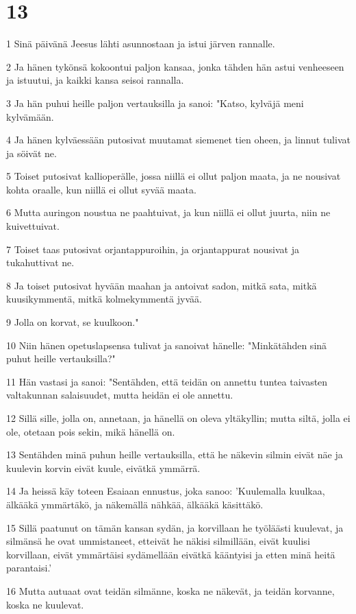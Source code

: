 \chapter{13}

\par 1 Sinä päivänä Jeesus lähti asunnostaan ja istui järven rannalle.
\par 2 Ja hänen tykönsä kokoontui paljon kansaa, jonka tähden hän astui venheeseen ja istuutui, ja kaikki kansa seisoi rannalla.
\par 3 Ja hän puhui heille paljon vertauksilla ja sanoi: "Katso, kylväjä meni kylvämään.
\par 4 Ja hänen kylväessään putosivat muutamat siemenet tien oheen, ja linnut tulivat ja söivät ne.
\par 5 Toiset putosivat kallioperälle, jossa niillä ei ollut paljon maata, ja ne nousivat kohta oraalle, kun niillä ei ollut syvää maata.
\par 6 Mutta auringon noustua ne paahtuivat, ja kun niillä ei ollut juurta, niin ne kuivettuivat.
\par 7 Toiset taas putosivat orjantappuroihin, ja orjantappurat nousivat ja tukahuttivat ne.
\par 8 Ja toiset putosivat hyvään maahan ja antoivat sadon, mitkä sata, mitkä kuusikymmentä, mitkä kolmekymmentä jyvää.
\par 9 Jolla on korvat, se kuulkoon."
\par 10 Niin hänen opetuslapsensa tulivat ja sanoivat hänelle: "Minkätähden sinä puhut heille vertauksilla?"
\par 11 Hän vastasi ja sanoi: "Sentähden, että teidän on annettu tuntea taivasten valtakunnan salaisuudet, mutta heidän ei ole annettu.
\par 12 Sillä sille, jolla on, annetaan, ja hänellä on oleva yltäkyllin; mutta siltä, jolla ei ole, otetaan pois sekin, mikä hänellä on.
\par 13 Sentähden minä puhun heille vertauksilla, että he näkevin silmin eivät näe ja kuulevin korvin eivät kuule, eivätkä ymmärrä.
\par 14 Ja heissä käy toteen Esaiaan ennustus, joka sanoo: 'Kuulemalla kuulkaa, älkääkä ymmärtäkö, ja näkemällä nähkää, älkääkä käsittäkö.
\par 15 Sillä paatunut on tämän kansan sydän, ja korvillaan he työläästi kuulevat, ja silmänsä he ovat ummistaneet, etteivät he näkisi silmillään, eivät kuulisi korvillaan, eivät ymmärtäisi sydämellään eivätkä kääntyisi ja etten minä heitä parantaisi.'
\par 16 Mutta autuaat ovat teidän silmänne, koska ne näkevät, ja teidän korvanne, koska ne kuulevat.
